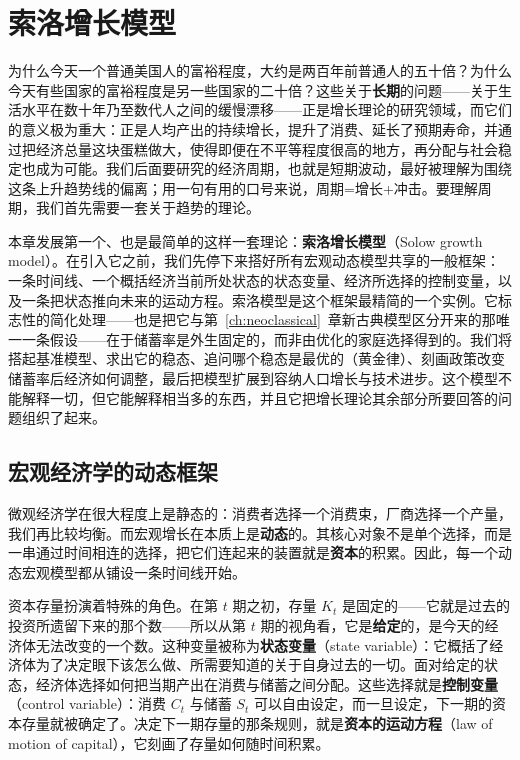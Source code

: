 \chapter{索洛增长模型}
\label{ch:solow}

为什么今天一个普通美国人的富裕程度，大约是两百年前普通人的五十倍？为什么今天有些国家的富裕程度是另一些国家的二十倍？这些关于\textbf{长期}的问题——关于生活水平在数十年乃至数代人之间的缓慢漂移——正是增长理论的研究领域，而它们的意义极为重大：正是人均产出的持续增长，提升了消费、延长了预期寿命，并通过把经济总量这块蛋糕做大，使得即便在不平等程度很高的地方，再分配与社会稳定也成为可能。我们后面要研究的经济周期，也就是短期波动，最好被理解为围绕这条上升趋势线的偏离；用一句有用的口号来说，周期=增长+冲击。要理解周期，我们首先需要一套关于趋势的理论。

本章发展第一个、也是最简单的这样一套理论：\textbf{索洛增长模型}（Solow growth model）。在引入它之前，我们先停下来搭好所有宏观动态模型共享的一般框架：一条时间线、一个概括经济当前所处状态的状态变量、经济所选择的控制变量，以及一条把状态推向未来的运动方程。索洛模型是这个框架最精简的一个实例。它标志性的简化处理——也是把它与第~\ref{ch:neoclassical}~章新古典模型区分开来的那唯一一条假设——在于储蓄率是外生固定的，而非由优化的家庭选择得到的。我们将搭起基准模型、求出它的稳态、追问哪个稳态是最优的（黄金律）、刻画政策改变储蓄率后经济如何调整，最后把模型扩展到容纳人口增长与技术进步。这个模型不能解释一切，但它能解释相当多的东西，并且它把增长理论其余部分所要回答的问题组织了起来。

\section{宏观经济学的动态框架}

微观经济学在很大程度上是静态的：消费者选择一个消费束，厂商选择一个产量，我们再比较均衡。而宏观增长在本质上是\textbf{动态}的。其核心对象不是单个选择，而是一串通过时间相连的选择，把它们连起来的装置就是\textbf{资本}的积累。因此，每一个动态宏观模型都从铺设一条时间线开始。


资本存量扮演着特殊的角色。在第 $t$ 期之初，存量 $K_t$ 是固定的——它就是过去的投资所遗留下来的那个数——所以从第 $t$ 期的视角看，它是\textbf{给定}的，是今天的经济体无法改变的一个数。这种变量被称为\textbf{状态变量}（state variable）：它概括了经济体为了决定眼下该怎么做、所需要知道的关于自身过去的一切。面对给定的状态，经济体选择如何把当期产出在消费与储蓄之间分配。这些选择就是\textbf{控制变量}（control variable）：消费 $C_t$ 与储蓄 $S_t$ 可以自由设定，而一旦设定，下一期的资本存量就被确定了。决定下一期存量的那条规则，就是\textbf{资本的运动方程}（law of motion of capital），它刻画了存量如何随时间积累。

